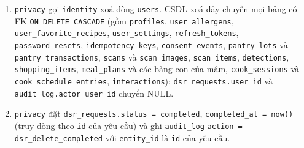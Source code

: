 \begin{enumerate}
\item {\small\texttt{privacy}} gọi {\small\texttt{identity}} xoá dòng {\small\texttt{users}}. CSDL xoá dây chuyền mọi bảng có FK {\small\texttt{ON DELETE CASCADE}} (gồm {\small\texttt{profiles}}, {\small\texttt{user\_\allowbreak{}\allowbreak{}allergens}}, {\small\texttt{user\_\allowbreak{}\allowbreak{}favorite\_\allowbreak{}\allowbreak{}recipes}}, {\small\texttt{user\_\allowbreak{}\allowbreak{}settings}}, {\small\texttt{refresh\_\allowbreak{}\allowbreak{}tokens}}, {\small\texttt{password\_\allowbreak{}\allowbreak{}resets}}, {\small\texttt{idempotency\_\allowbreak{}\allowbreak{}keys}}, {\small\texttt{consent\_\allowbreak{}\allowbreak{}events}}, {\small\texttt{pantry\_\allowbreak{}\allowbreak{}lots}} và {\small\texttt{pantry\_\allowbreak{}\allowbreak{}transactions}}, {\small\texttt{scans}} và {\small\texttt{scan\_\allowbreak{}\allowbreak{}images}}, {\small\texttt{scan\_\allowbreak{}\allowbreak{}items}}, {\small\texttt{detections}}, {\small\texttt{shopping\_\allowbreak{}\allowbreak{}items}}, {\small\texttt{meal\_\allowbreak{}\allowbreak{}plans}} và các bảng con của mâm, {\small\texttt{cook\_\allowbreak{}\allowbreak{}sessions}} và {\small\texttt{cook\_\allowbreak{}\allowbreak{}schedule\_\allowbreak{}\allowbreak{}entries}}, {\small\texttt{interactions}}); {\small\texttt{dsr\_\allowbreak{}\allowbreak{}requests.\allowbreak{}user\_\allowbreak{}\allowbreak{}id}} và {\small\texttt{audit\_\allowbreak{}\allowbreak{}log.\allowbreak{}actor\_\allowbreak{}\allowbreak{}user\_\allowbreak{}\allowbreak{}id}} chuyển NULL.
\item {\small\texttt{privacy}} đặt {\small\texttt{dsr\_\allowbreak{}\allowbreak{}requests.\allowbreak{}status = completed}}, {\small\texttt{completed\_\allowbreak{}\allowbreak{}at = now()}} (truy dòng theo {\small\texttt{id}} của yêu cầu) và ghi {\small\texttt{audit\_\allowbreak{}\allowbreak{}log}} {\small\texttt{action = dsr\_\allowbreak{}\allowbreak{}delete\_\allowbreak{}\allowbreak{}completed}} với {\small\texttt{entity\_\allowbreak{}\allowbreak{}id}} là {\small\texttt{id}} của yêu cầu.
\end{enumerate}
